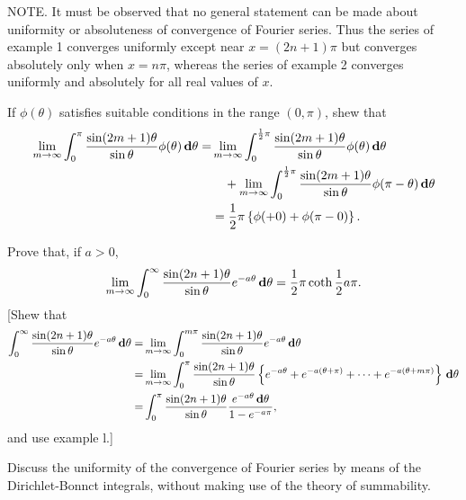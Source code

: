 NOTE. It must be observed that no general statement can be made about
uniformity or absoluteness of convergence of Fourier series. Thus the
series of  example 1 %
converges uniformly except near $x = (2n+1)\pi$
but converges absolutely only when $x = n\pi$, whereas the series of
 example 2 %
converges uniformly and absolutely for all real values
of $x$.
\begin{wandwexample}
 If $\phi(\theta)$ satisfies suitable conditions in the range $(0, \pi)$,
shew that
\begin{align*}
  \lim_{m \rightarrow \infty}
  \int_{0}^{\pi}
  \frac{\sin (2m+1)\theta}{\sin \theta}
  \phi(\theta) \, \mathbf{d} \theta
  =&
  \lim_{m \rightarrow \infty}
  \int_{0}^{\frac{1}{2} \pi}
  \frac{\sin (2m+1)\theta}{\sin \theta}
  \phi(\theta) \, \mathbf{d} \theta
  \\
  & \quad
  +
  \lim_{m \rightarrow \infty}
  \int_{0}^{\frac{1}{2} \pi}
  \frac{\sin (2m+1)\theta}{\sin \theta}
  \phi(\pi - \theta) \, \mathbf{d} \theta
  \\
  &
  = \frac{1}{2} \pi \left\{ 
    \phi(+0) + \phi(\pi - 0)
   \right\}.
\end{align*}
\end{wandwexample}
\begin{wandwexample}
 Prove that, if $a > 0$,
 $$
 \lim_{m \rightarrow \infty}
 \int_{0}^{\infty}
 \frac{\sin (2n+1)\theta}{\sin \theta}
 e^{-a\theta}
 \, \mathbf{d} \theta
 =
 \frac{1}{2} \pi \coth \frac{1}{2} a \pi.
 $$
 [Shew that
 \begin{align*}
   \int_{0}^{\infty}
   \frac{\sin (2n+1)\theta}{\sin \theta}
   e^{-a\theta} \, \mathbf{d} \theta
   =&
   \lim_{m \rightarrow \infty}
   \int_{0}^{m \pi}
   \frac{\sin (2n+1)\theta}{\sin \theta}
   e^{-a\theta} \, \mathbf{d} \theta
   \\
   =&
   \lim_{m \rightarrow \infty}
   \int_{0}^{\pi}
   \frac{\sin (2n+1)\theta}{\sin \theta}
   \left\{ 
     e^{-a \theta}
     + e^{-a(\theta + \pi)}
     + \cdots
     + e^{-a(\theta + m \pi)}
    \right\} \, \mathbf{d} \theta
   \\
   =&
   \int_{0}^{\pi}
   \frac{\sin (2n+1)\theta}{\sin \theta}
   \frac{e^{-a \theta} \, \mathbf{d} \theta}{1 - e^{-a\pi}},
 \end{align*}
 and use example l.] %
\end{wandwexample}
\begin{wandwexample}
  Discuss the uniformity of the convergence of Fourier series
  by means of the Dirichlet-Bonnct integrals, without making use of the
  theory of summability.
\end{wandwexample}
